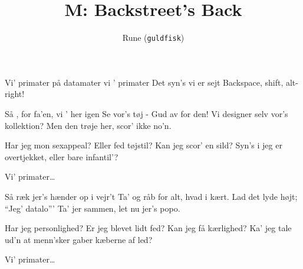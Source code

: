 \documentclass[danish]{article}
\title{M: Backstreet's Back}
\author{Rune (\texttt{guldfisk})}
\begin{document}
\twocolumn[ %
\maketitle
]
\begin{song}

 Vi' primater 
på datamater 
vi ' primater
Det syn's vi er sejt
Backspace, shift, alt-right!

 Så , for fa'en, vi ' her igen
Se vor's tøj - Gud av for den!
Vi designer selv vor's kollektion?
Men den trøje her, scor' ikke no'n.

Har jeg mon sexappeal? 
Eller fed tøjstil?                      
Kan jeg scor' en sild?                  
Syn's i jeg er overtjekket,
eller bare infantil'?

 Vi' primater\ldots

 Så ræk jer's hænder op i vejr't
Ta' og råb for alt, hvad i kært.
Lad det lyde højt; ``Jeg' datalo'''
Ta' jer sammen, let nu jer's popo.

Har jeg personlighed?                   
Er jeg blevet lidt fed?                 
Kan jeg få kærlighed?                   
Ka' jeg tale ud'n at menn'sker
gaber kæberne af led?

 Vi' primater\ldots

\end{song}
\end{document}
